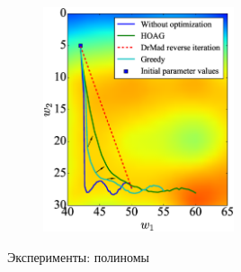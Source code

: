 \documentclass[10pt,pdf,utf8,russian,aspectratio=169]{beamer}
\begin{document}
\begin{frame}
\begin{figure}  
\includegraphics[width=0.5\textwidth]{Fig_traj.eps}
\end{figure}
\end{frame}

\begin{frame}{Эксперименты: полиномы}
\begin{figure}
  \centering
\label{fig:1}\qquad

\end{figure}
\end{frame}
\end{document}
